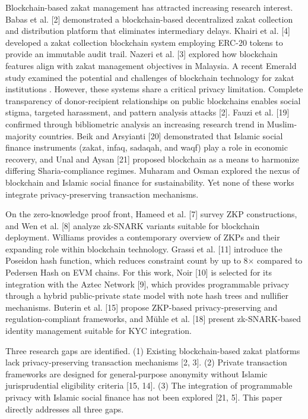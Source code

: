 \documentclass[conference]{IEEEtran}
\begin{document}
Blockchain-based zakat management has attracted increasing research interest. Babas et al. [2] demonstrated a blockchain-based decentralized zakat collection and distribution platform that eliminates intermediary delays. Khairi et al. [4] developed a zakat collection blockchain system employing ERC-20 tokens to provide an immutable audit trail. Nazeri et al. [3] explored how blockchain features align with zakat management objectives in Malaysia. A recent Emerald study examined the potential and challenges of blockchain technology for zakat institutions \cite{b_zakat_emerald}. However, these systems share a critical privacy limitation. Complete transparency of donor-recipient relationships on public blockchains enables social stigma, targeted harassment, and pattern analysis attacks [2]. Fauzi et al. [19] confirmed through bibliometric analysis an increasing research trend in Muslim-majority countries. Beik and Arsyianti [20] demonstrated that Islamic social finance instruments (zakat, infaq, sadaqah, and waqf) play a role in economic recovery, and Unal and Aysan [21] proposed blockchain as a means to harmonize differing Sharia-compliance regimes. Muharam and Osman \cite{b_isf_blockchain} explored the nexus of blockchain and Islamic social finance for sustainability. Yet none of these works integrate privacy-preserving transaction mechanisms.

On the zero-knowledge proof front, Hameed et al. [7] survey ZKP constructions, and Wen et al. [8] analyze zk-SNARK variants suitable for blockchain deployment. Williams \cite{b_zkp_cacm} provides a contemporary overview of ZKPs and their expanding role within blockchain technology. Grassi et al. [11] introduce the Poseidon hash function, which reduces constraint count by up to 8$\times$ compared to Pedersen Hash on EVM chains. For this work, Noir [10] is selected for its integration with the Aztec Network [9], which provides programmable privacy through a hybrid public-private state model with note hash trees and nullifier mechanisms. Buterin et al. [15] propose ZKP-based privacy-preserving and regulation-compliant frameworks, and M\"{u}hle et al. [18] present zk-SNARK-based identity management suitable for KYC integration.

Three research gaps are identified. (1) Existing blockchain-based zakat platforms lack privacy-preserving transaction mechanisms [2, 3]. (2) Private transaction frameworks are designed for general-purpose anonymity without Islamic jurisprudential eligibility criteria [15, 14]. (3) The integration of programmable privacy with Islamic social finance has not been explored [21, 5]. This paper directly addresses all three gaps.
\end{document}
